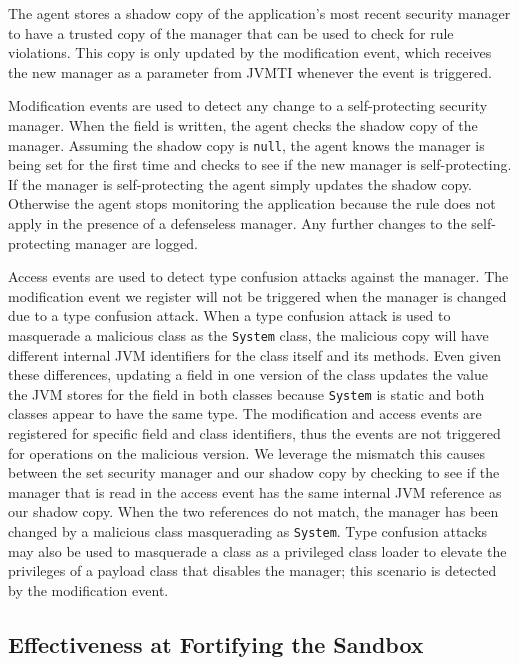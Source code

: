 \documentclass{sig-alternate}
\begin{document}
The agent stores a shadow copy of the application's most recent security
manager to have a trusted copy of the manager that can be used to
check for rule violations. This copy is only
updated by the modification event, which receives the new manager
as a parameter from JVMTI whenever the event is triggered.

Modification events are used to detect any change to a self-protecting
security manager. When the field is written, the agent checks the
shadow copy of the manager. Assuming the shadow copy is \texttt{null},
the agent knows the manager is being set for the first time and checks
to see if the new manager is self-protecting. If the manager is self-protecting
the agent simply updates the shadow copy. Otherwise the agent stops monitoring the application because the rule does not apply in the presence of a defenseless manager. Any further changes to the self-protecting manager are logged.

Access events are used to detect type confusion attacks against the
manager. The modification event we register will not be triggered
when the manager is changed due to a type confusion attack. When a
type confusion attack is used to masquerade a malicious class as the
\texttt{System} class, the malicious copy will have different internal
JVM identifiers for the class itself and its methods. Even given these
differences, updating a field in one version of the class updates
the value the JVM stores for the field in both classes because \texttt{System} is static and both classes appear to have the same type. The
modification and access events are registered for specific field and
class identifiers, thus the events are not triggered for operations
on the malicious version. We leverage the mismatch this causes between
the set security manager and our shadow copy by checking to see if
the manager that is read in the access event has the same internal
JVM reference as our shadow copy. When the two references do not match,
the manager has been changed by a malicious class masquerading as
\texttt{System}. Type confusion attacks may also be used to masquerade
a class as a privileged class loader to elevate the privileges of
a payload class that disables the manager; this scenario is detected
by the modification event.


\subsection{Effectiveness at Fortifying the Sandbox}\label{sub:Effectiveness-at-Fortifying}
\end{document}
